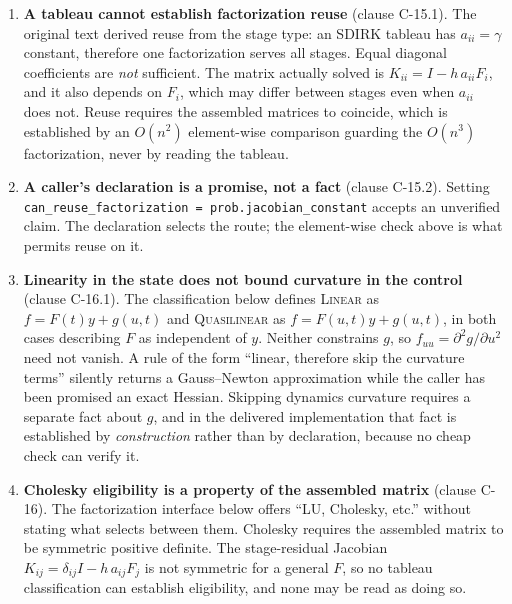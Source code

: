 \documentclass[11pt]{article}
\begin{document}
\begin{enumerate}[leftmargin=*]

\item \textbf{A tableau cannot establish factorization reuse} (clause C-15.1).
The original text derived reuse from the stage type: an SDIRK tableau has
$a_{ii}=\gamma$ constant, therefore one factorization serves all stages. Equal
diagonal coefficients are \emph{not} sufficient. The matrix actually solved is
$K_{ii} = I - h\,a_{ii}F_i$, and it also depends on $F_i$, which may differ
between stages even when $a_{ii}$ does not. Reuse requires the assembled
matrices to coincide, which is established by an $O(n^2)$ element-wise
comparison guarding the $O(n^3)$ factorization, never by reading the tableau.

\item \textbf{A caller's declaration is a promise, not a fact} (clause C-15.2).
Setting \texttt{can\_reuse\_factorization = prob.jacobian\_constant} accepts an
unverified claim. The declaration selects the route; the element-wise check
above is what permits reuse on it.

\item \textbf{Linearity in the state does not bound curvature in the control}
(clause C-16.1). The classification below defines \textsc{Linear} as
$f = F(t)y + g(u,t)$ and \textsc{Quasilinear} as $f = F(u,t)y + g(u,t)$, in
both cases describing $F$ as independent of $y$. Neither constrains $g$, so
$f_{uu} = \partial^2 g/\partial u^2$ need not vanish. A rule of the form
``linear, therefore skip the curvature terms'' silently returns a
Gauss--Newton approximation while the caller has been promised an exact
Hessian. Skipping dynamics curvature requires a separate fact about $g$, and
in the delivered implementation that fact is established by \emph{construction}
rather than by declaration, because no cheap check can verify it.

\item \textbf{Cholesky eligibility is a property of the assembled matrix}
(clause C-16). The factorization interface below offers ``LU, Cholesky, etc.''
without stating what selects between them. Cholesky requires the assembled
matrix to be symmetric positive definite. The stage-residual Jacobian
$K_{ij} = \delta_{ij}I - h\,a_{ij}F_j$ is not symmetric for a general $F$, so
no tableau classification can establish eligibility, and none may be read as
doing so.

\end{enumerate}
\end{document}
